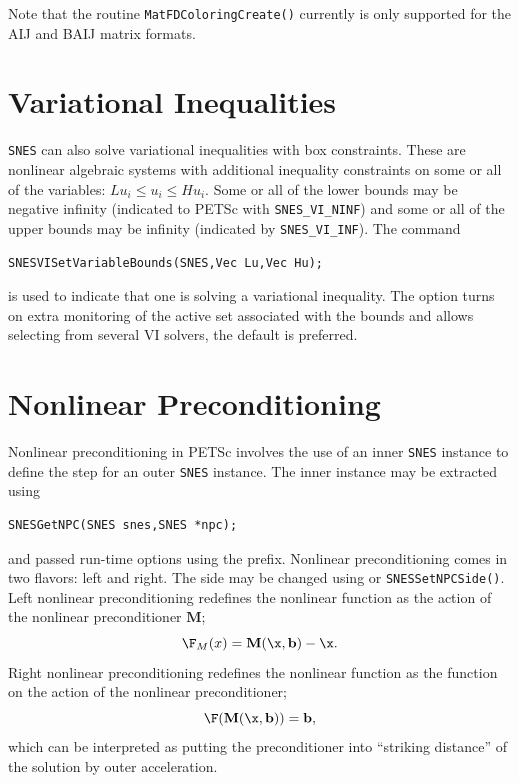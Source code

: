 Note that the routine \lstinline{MatFDColoringCreate()} currently is only supported for the AIJ and BAIJ matrix formats.

\section{Variational Inequalities}
\label{sec_vi}

\lstinline{SNES} can also solve variational inequalities with box constraints.
These are nonlinear algebraic systems with additional inequality constraints on some or all of the variables: $ Lu_i \le u_i \le Hu_i $.
Some or all of the lower bounds may be negative infinity (indicated to PETSc with \lstinline{SNES_VI_NINF}) and some or all of the upper bounds may be infinity (indicated by \lstinline{SNES_VI_INF}). The command
\begin{lstlisting}
SNESVISetVariableBounds(SNES,Vec Lu,Vec Hu);
\end{lstlisting}
is  used to indicate that one is solving a variational inequality. The option   turns on extra monitoring of the active set associated with the bounds and   allows selecting from several VI solvers, the default is preferred.

\section{Nonlinear Preconditioning}

Nonlinear preconditioning in PETSc involves the use of an inner \lstinline{SNES} instance to define the step for an outer \lstinline{SNES}
instance.  The inner instance may be extracted using
\begin{lstlisting}
SNESGetNPC(SNES snes,SNES *npc);
\end{lstlisting}
and passed run-time options using the 
prefix. Nonlinear preconditioning comes in two flavors: left and right.  The side may be changed
using  or \lstinline{SNESSetNPCSide()}. Left nonlinear preconditioning redefines the nonlinear function as the action of the
nonlinear preconditioner $\mathbf{M}$;
\begin{equation}
        \F_{M}(x) = \mathbf{M}(\x,\mathbf{b}) - \x.
\end{equation}
\noindent Right nonlinear preconditioning redefines the nonlinear function as the function on the action of the
nonlinear preconditioner;
\begin{equation}
        \F(\mathbf{M}(\x,\mathbf{b})) = \mathbf{b},
\end{equation}
\noindent  which can be interpreted as putting the preconditioner into ``striking distance'' of the solution by outer acceleration.

